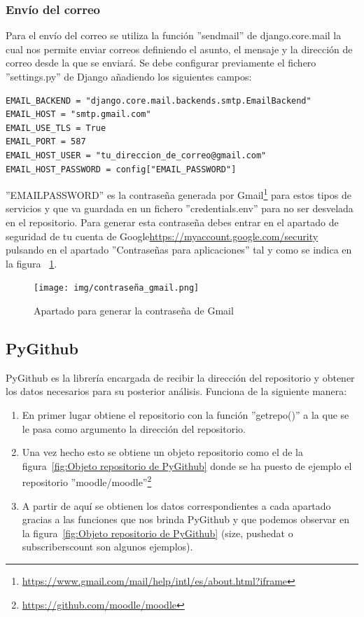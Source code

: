 \documentclass[a4paper, 12pt]{book}
\begin{document}
\subsubsection{Envío del correo}

Para el envío del correo se utiliza la función ''send\textunderscore mail'' de django.core.mail la cual nos permite enviar correos definiendo el asunto, el mensaje y la dirección de correo desde la que se enviará. Se debe configurar previamente el fichero ''settings.py'' de Django añadiendo los siguientes campos:

\begin{verbatim}
EMAIL_BACKEND = "django.core.mail.backends.smtp.EmailBackend"
EMAIL_HOST = "smtp.gmail.com"
EMAIL_USE_TLS = True
EMAIL_PORT = 587
EMAIL_HOST_USER = "tu_direccion_de_correo@gmail.com"
EMAIL_HOST_PASSWORD = config["EMAIL_PASSWORD"]
\end{verbatim}

''EMAIL\textunderscore PASSWORD'' es la contraseña generada por Gmail\footnote{\url{https://www.gmail.com/mail/help/intl/es/about.html?iframe}} para estos tipos de servicios y que va guardada en un fichero ''credentials.env'' para no ser desvelada en el repositorio. Para generar esta contraseña debes entrar en el apartado de seguridad de tu cuenta de Google{\url{https://myaccount.google.com/security}} pulsando en el apartado ''Contraseñas para aplicaciones'' tal y como se indica en la figura ~\ref{fig:contraseña gmail}.

\begin{figure}
    \centering
    \texttt{[image: img/contraseña\_gmail.png]}
    \caption{Apartado para generar la contraseña de Gmail}\label{fig:contraseña gmail}
\end{figure}

\subsection{PyGithub}

PyGithub es la librería encargada de recibir la dirección del repositorio y obtener los datos necesarios para su posterior análisis. Funciona de la siguiente manera:

\begin{enumerate}
	\item En primer lugar obtiene el repositorio con la función ''get\textunderscore repo()'' a la que se le pasa como argumento la dirección del repositorio.
	\item Una vez hecho esto se obtiene un objeto repositorio como el de la figura~\ref{fig:Objeto repositorio de PyGithub} donde se ha puesto de ejemplo el repositorio ''moodle/moodle''\footnote{\url{https://github.com/moodle/moodle}}
	\item A partir de aquí se obtienen los datos correspondientes a cada apartado gracias a las funciones que nos brinda PyGithub y que podemos observar en la figura~\ref{fig:Objeto repositorio de PyGithub} (size, pushed\textunderscore at o subscribers\textunderscore count son algunos ejemplos). 
\end{enumerate}
\end{document}
